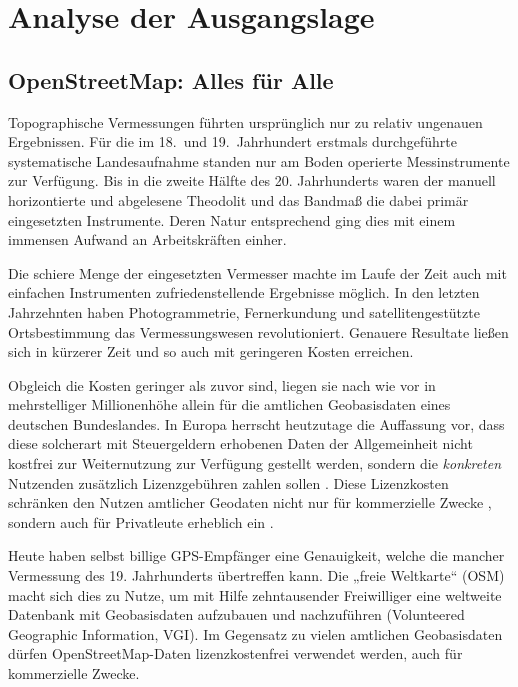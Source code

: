 \documentclass[../main/thesis.tex]{subfiles}
\begin{document}
\chapter{Analyse der Ausgangslage}

\begin{draft}
\section{OpenStreetMap: Alles für Alle}
Topographische Vermessungen führten ursprünglich nur zu relativ ungenauen Ergebnissen. 
Für die im 18.~und 19.~Jahrhundert erstmals durchgeführte systematische Landesaufnahme standen nur am Boden operierte Messinstrumente zur Verfügung.
Bis in die zweite Hälfte des 20. Jahrhunderts waren der manuell horizontierte und abgelesene Theodolit und das Bandmaß die dabei primär eingesetzten Instrumente. 
Deren Natur entsprechend ging dies mit einem immensen Aufwand an Arbeitskräften einher.

Die schiere Menge der eingesetzten Vermesser machte im Laufe der Zeit auch mit einfachen Instrumenten zufriedenstellende Ergebnisse möglich.
In den letzten Jahrzehnten haben Photogrammetrie, Fernerkundung und satellitengestützte Ortsbestimmung das Vermessungswesen revolutioniert.
Genauere Resultate ließen sich in kürzerer Zeit und so auch mit geringeren Kosten erreichen. \noref


Obgleich die Kosten geringer als zuvor sind, liegen sie nach wie vor in mehrstelliger Millionenhöhe allein für die amtlichen Geobasisdaten eines deutschen Bundeslandes. 
In Europa \noref herrscht heutzutage  die Auffassung vor, dass diese solcherart mit Steuergeldern erhobenen Daten der Allgemeinheit nicht kostfrei zur Weiternutzung zur Verfügung gestellt werden, sondern die \emph{konkreten} Nutzenden zusätzlich Lizenzgebühren zahlen sollen \noref.
Diese Lizenzkosten schränken den Nutzen amtlicher Geodaten nicht nur für kommerzielle Zwecke , sondern auch für Privatleute \noref erheblich ein \noref.


Heute haben selbst billige GPS-Empfänger eine Genauigkeit, welche die mancher Vermessung des 19. Jahrhunderts übertreffen kann. 
Die „freie Weltkarte“  (OSM)  macht sich dies zu Nutze, um mit Hilfe zehntausender Freiwilliger eine weltweite Datenbank mit Geobasisdaten aufzubauen und nachzuführen (Volunteered Geographic Information, VGI). 
Im Gegensatz zu vielen amtlichen Geobasisdaten dürfen OpenStreetMap-Daten lizenzkostenfrei verwendet werden, auch für kommerzielle Zwecke. 


\end{draft}
\end{document}

